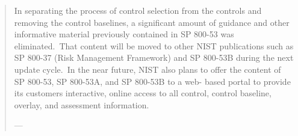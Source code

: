 \begin{formal}
\begin{quote}
In separating the process of control selection from the controls and removing the control baselines, a significant amount of guidance and other informative material previously contained in SP 800-53 was eliminated.\ That content will be moved to other NIST publications such as SP 800-37 (Risk Management Framework) and SP 800-53B during the next update cycle.\ In the near future, NIST also plans to offer the content of SP 800-53, SP 800-53A, and SP 800-53B to a web- based portal to provide its customers interactive, online access to all control, control baseline, overlay, and assessment information.

\hfill
---\cite{csfNIST80053}

\end{quote}
\end{formal} 